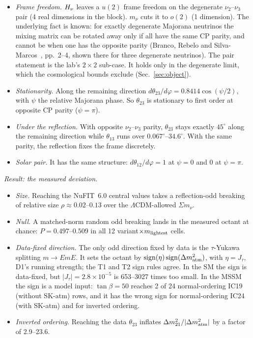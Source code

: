 \begin{itemize}
\item \emph{Frame freedom.} $H_\nu$ leaves a $u(2)$ frame freedom on the degenerate $\nu_2$--$\nu_3$
  pair (4 real dimensions in the block). $m_\nu$ cuts it to $o(2)$ (1 dimension). The underlying
  fact is known: for exactly degenerate Majorana neutrinos the mixing matrix can be rotated away
  only if all have the same CP parity, and cannot be when one has the opposite parity
  (Branco, Rebelo and Silva-Marcos~\cite{brsm1999}, pp.~2--4, shown there for three degenerate
  neutrinos). The pair statement is the lab's $2\times2$ sub-case. It holds only in the degenerate
  limit, which the cosmological bounds exclude (Sec.~\ref{sec:object}).
\item \emph{Stationarity.} Along the remaining direction
  $d\theta_{23}/d\varphi=0.8414\cos(\psi/2)$, with $\psi$ the relative Majorana phase. So
  $\theta_{23}$ is stationary to first order at opposite CP parity ($\psi=\pi$).
\item \emph{Under the reflection.} With opposite $\nu_2$--$\nu_3$ parity, $\theta_{23}$ stays
  exactly $45^\circ$ along the remaining direction while $\theta_{13}$ runs over
  $0.067^\circ$--$34.6^\circ$. With the same parity, the reflection fixes the frame discretely.
\item \emph{Solar pair.} It has the same structure: $d\theta_{12}/d\varphi=1$ at $\psi=0$ and $0$ at
  $\psi=\pi$.
\end{itemize}
\emph{Result: the measured deviation.}
\begin{itemize}
\item \emph{Size.} Reaching the NuFIT~6.0 central values takes a reflection-odd breaking of relative size
  $\rho\approx0.02$--$0.13$ over the $\Lambda$CDM-allowed $\Sigma m_\nu$.
\item \emph{Null.} A matched-norm random odd breaking lands in the measured octant at chance:
  $P=0.497$--$0.509$ in all 12 variant$\times m_{\rm lightest}$ cells.
\item \emph{Data-fixed direction.} The only odd direction fixed by data is the $\tau$-Yukawa
  splitting $m\to EmE$. It sets the octant by
  $\operatorname{sign}(\eta)\operatorname{sign}(\Delta m^2_{\rm atm})$, with $\eta=J_\tau$, D1's
  running strength; the T1 and T2 sign rules agree. In the SM the sign is data-fixed, but
  $|J_\tau|=2.8\times10^{-5}$ is 653--3027 times too small. In the MSSM the sign is a model input:
  $\tan\beta=50$ reaches 2 of 24 normal-ordering IC19 (without SK-atm) rows, and it has the wrong
  sign for normal-ordering IC24 (with SK-atm) and for inverted ordering.
\item \emph{Inverted ordering.} Reaching the data $\theta_{23}$ inflates
  $\Delta m^2_{21}/|\Delta m^2_{\rm atm}|$ by a factor of 2.9--23.6.
\end{itemize}

